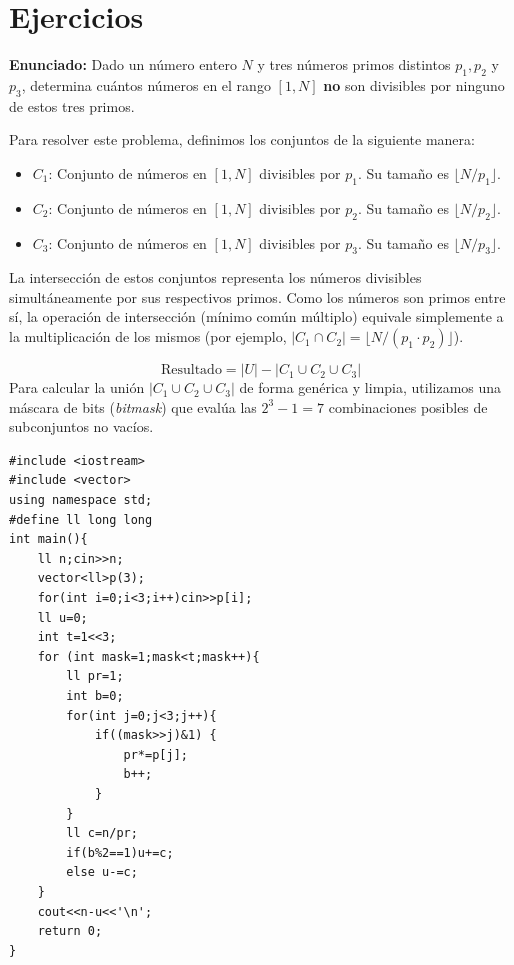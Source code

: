 \documentclass[11pt,a4paper]{article}
\begin{document}
\section*{Ejercicios}
\textbf{Enunciado:} Dado un número entero $N$ y tres números primos distintos $p_1, p_2$ y $p_3$, determina cuántos números en el rango $[1, N]$ \textbf{no} son divisibles por ninguno de estos tres primos.\par
Para resolver este problema, definimos los conjuntos de la siguiente manera:
\begin{itemize}
    \item $C_1$: Conjunto de números en $[1, N]$ divisibles por $p_1$. Su tamaño es $\lfloor N / p_1 \rfloor$.
    \item $C_2$: Conjunto de números en $[1, N]$ divisibles por $p_2$. Su tamaño es $\lfloor N / p_2 \rfloor$.
    \item $C_3$: Conjunto de números en $[1, N]$ divisibles por $p_3$. Su tamaño es $\lfloor N / p_3 \rfloor$.
\end{itemize}
La intersección de estos conjuntos representa los números divisibles simultáneamente por sus respectivos primos. Como los números son primos entre sí, la operación de intersección (mínimo común múltiplo) equivale simplemente a la multiplicación de los mismos (por ejemplo, $|C_1 \cap C_2| = \lfloor N / (p_1 \cdot p_2) \rfloor$).\par
\begin{equation}
    \text{Resultado} = |U| - |C_1 \cup C_2 \cup C_3|
\end{equation}
Para calcular la unión $|C_1 \cup C_2 \cup C_3|$ de forma genérica y limpia, utilizamos una máscara de bits (\textit{bitmask}) que evalúa las $2^3 - 1 = 7$ combinaciones posibles de subconjuntos no vacíos.
\begin{lstlisting}
#include <iostream>
#include <vector>
using namespace std;
#define ll long long
int main(){    
    ll n;cin>>n;    
    vector<ll>p(3);
    for(int i=0;i<3;i++)cin>>p[i];
    ll u=0;
    int t=1<<3;
    for (int mask=1;mask<t;mask++){
        ll pr=1;
        int b=0;
        for(int j=0;j<3;j++){
            if((mask>>j)&1) {
                pr*=p[j];
                b++;
            }
        }
        ll c=n/pr;
        if(b%2==1)u+=c;
        else u-=c;
    }
    cout<<n-u<<'\n';
    return 0;
}
\end{lstlisting}
\end{document}
